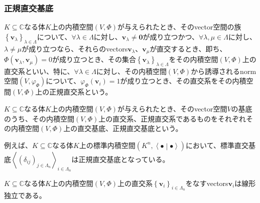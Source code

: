 \documentclass[dvipdfmx]{jsarticle}
\begin{document}
\subsubsection{正規直交基底}%
\begin{dfn}
$K \subseteq \mathbb{C}$なる体$K$上の内積空間$(V,\varPhi)$が与えられたとき、そのvector空間の族$\left\{ \mathbf{v}_{\lambda} \right\}_{\lambda \in \varLambda}$について、$\forall\lambda \in \varLambda$に対し、$\mathbf{v}_{\lambda} \neq \mathbf{0}$が成り立つかつ、$\forall\lambda,\mu \in \varLambda$に対し、$\lambda \neq \mu$が成り立つなら、それらのvectors$\mathbf{v}_{\lambda}$、$\mathbf{v}_{\mu}$が直交するとき、即ち、$\varPhi\left( \mathbf{v}_{\lambda},\mathbf{v}_{\mu} \right) = 0$が成り立つとき、その集合$\left\{ \mathbf{v}_{\lambda} \right\}_{\lambda \in \varLambda}$をその内積空間$(V,\varPhi)$上の直交系といい、特に、$\forall\lambda \in \varLambda$に対し、その内積空間$(V,\varPhi)$から誘導されるnorm空間$\left( V,\varphi_{\varPhi} \right)$について、$\varphi_{\varPhi}\left( \mathbf{v}_{i} \right) = 1$が成り立つとき、その直交系をその内積空間$(V,\varPhi)$上の正規直交系という。
\end{dfn}
\begin{dfn}
$K \subseteq \mathbb{C}$なる体$K$上の内積空間$(V,\varPhi)$が与えられたとき、そのvector空間$V$の基底のうち、その内積空間$(V,\varPhi)$上の直交系、正規直交系であるものをそれぞれその内積空間$(V,\varPhi)$上の直交基底、正規直交基底という。
\end{dfn}\par
例えば、$K \subseteq \mathbb{C}$なる体$K$上の標準内積空間$\left( K^{n},\left\langle \bullet \middle| \bullet \right\rangle \right)$において、標準直交基底$\left\langle \left( \delta_{ij} \right)_{j \in \varLambda_{n}} \right\rangle_{i \in \varLambda_{n}}$は正規直交基底となっている。
\begin{thm}\label{2.3.6.10}
$K \subseteq \mathbb{C}$なる体$K$上の内積空間$(V,\varPhi)$上の直交系$\left\{ \mathbf{v}_{i} \right\}_{i \in \varLambda_{n}}$をなすvectors$\mathbf{v}_{i}$は線形独立である。
\end{thm}
\end{document}
